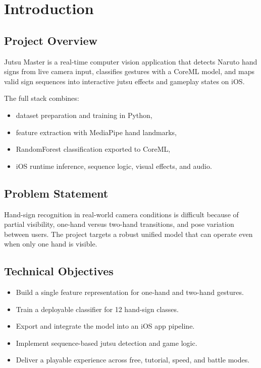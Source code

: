 \chapter{Introduction}

\section{Project Overview}
Jutsu Master is a real-time computer vision application that detects Naruto hand signs from live camera input, classifies gestures with a CoreML model, and maps valid sign sequences into interactive jutsu effects and gameplay states on iOS.

The full stack combines:
\begin{itemize}[leftmargin=2em]
\item dataset preparation and training in Python,
\item feature extraction with MediaPipe hand landmarks,
\item RandomForest classification exported to CoreML,
\item iOS runtime inference, sequence logic, visual effects, and audio.
\end{itemize}

\section{Problem Statement}
Hand-sign recognition in real-world camera conditions is difficult because of partial visibility, one-hand versus two-hand transitions, and pose variation between users. The project targets a robust unified model that can operate even when only one hand is visible.

\section{Technical Objectives}
\begin{itemize}[leftmargin=2em]
\item Build a single feature representation for one-hand and two-hand gestures.
\item Train a deployable classifier for 12 hand-sign classes.
\item Export and integrate the model into an iOS app pipeline.
\item Implement sequence-based jutsu detection and game logic.
\item Deliver a playable experience across free, tutorial, speed, and battle modes.
\end{itemize}

